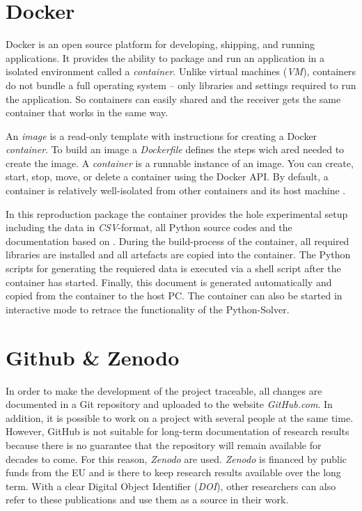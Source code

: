 \documentclass{article}
\begin{document}
\begin{multicols}{2}
\section{Docker} \label{sec:Docker}
Docker is an open source platform for developing, shipping, and running applications. It provides the ability to package and run an application in a isolated environment called a \textit{container}. Unlike virtual machines (\textit{VM}), containers do not bundle a full operating system -- only libraries and settings required to run the application. So containers can easily shared and the receiver gets the same container that works in the same way.

An \textit{image} is a read-only template with instructions for creating a Docker \textit{container}. To build an image a \textit{Dockerfile} defines the steps wich ared needed to create the image. A \textit{container} is a runnable instance of an image. You can create, start, stop, move, or delete a container using the Docker API. By default, a container is relatively well-isolated from other containers and its host machine \cite{Docker}. 

In this reproduction package the container provides the hole experimental setup including the data in \textit{CSV}-format, all Python source codes and the documentation based on \LaTex. During the build-process of the container, all required libraries are installed and all artefacts are copied into the container. The Python scripts for generating the requiered data is executed via a shell script after the container has started. Finally, this document is generated automatically and copied from the container to the host PC. The container can also be started in interactive mode to retrace the functionality of the Python-Solver.

\section{Github \& Zenodo}
In order to make the development of the project traceable, all changes are documented in a Git repository and uploaded to the website \textit{GitHub.com}. In addition, it is possible to work on a project with several people at the same time. However, GitHub is not suitable for long-term documentation of research results because there is no guarantee that the repository will remain available for decades to come. For this reason, \textit{Zenodo} are used.
\textit{Zenodo} \cite{zenodo} is financed by public funds from the EU and is there to keep research results available over the long term. With a clear Digital Object Identifier (\textit{DOI}), other researchers can also refer to these publications and use them as a source in their work.



\end{multicols}
\end{document}
